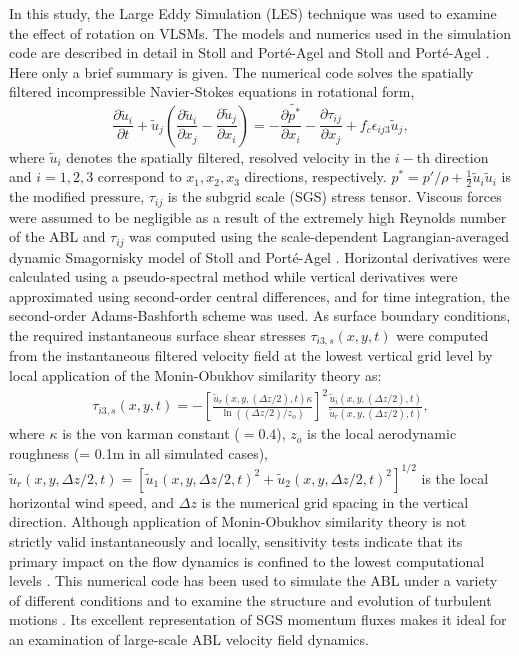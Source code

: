 In this study, the Large Eddy Simulation (LES) technique was used to examine the effect of rotation on VLSMs. The models and numerics used in the simulation code are described in detail in Stoll and Port{\'e}-Agel \cite{stoll_wrr_2006} and Stoll and Port{\'e}-Agel \cite{stoll_blm_2008}.  Here only a brief summary is given.  The numerical code solves the spatially filtered incompressible Navier-Stokes equations in rotational form,
\begin{equation}
    \frac{\partial \tilde{u}_i}{\partial t}+ \tilde{u}_j\left(\frac{\partial \tilde{u}_i}{\partial x_{j}} -\frac{\partial \tilde{u}_j}{\partial x_{i}} \right)  = -\frac{\partial \tilde{p^*}}{\partial x_i}-\frac{\partial \tau_{ij}}{\partial x_j}+f_{c}\epsilon_{ij3}\tilde{u}_{j},  
\label{eqn:les_eqn}
\end{equation}
\noindent where $\tilde{u}_i$ denotes the spatially filtered, resolved velocity in the $i-$th direction and $i=1, 2, 3$ correspond to $x_1, x_2, x_3$ directions, respectively. $p^{*}=p'/\rho + \frac{1}{2}\tilde{u}_i\tilde{u}_i$ is the modified pressure, $\tau_{ij}$ is the subgrid scale (SGS) stress tensor. Viscous forces were assumed to be negligible as a result of the extremely high Reynolds number of the ABL and $\tau_{ij}$ was computed using the scale-dependent Lagrangian-averaged dynamic Smagornisky model of  Stoll and Port{\'e}-Agel \cite{stoll_wrr_2006}. Horizontal derivatives were calculated using a pseudo-spectral method while vertical derivatives were approximated using second-order central differences, and for time integration, the second-order Adams-Bashforth scheme was used. As surface boundary conditions, the required instantaneous surface shear stresses $\tau_{i3,s}(x,y,t)$  were computed from the instantaneous filtered velocity field at the lowest vertical grid level by local application of the Monin-Obukhov similarity theory \cite{stoll_blm_2006} as:
\begin{align}
\tau_{i3,s}(x,y,t) = -\left [ \frac{\tilde{u}_r(x,y,(\Delta z/2),t)\kappa}{\ln((\Delta z/2)/z_o)} \right ]^2\frac{\tilde{u}_i(x,y,(\Delta z/2),t)}{\tilde{u}_r(x,y,(\Delta z/2),t)}, 
\end{align}
\noindent where $\kappa$ is the von karman constant ($=0.4$), $z_o$ is the local aerodynamic roughness (= 0.1m in all simulated cases), $\tilde{u}_r(x,y,\Delta z/2,t)=[\tilde{u}_1(x,y,\Delta z/2,t)^{2}+\tilde{u}_2(x,y,\Delta z/2,t)^{2}]^{1/2}$ is the local horizontal wind speed, and $\Delta z$ is the numerical grid spacing in the vertical direction. Although application of Monin-Obukhov similarity theory is not strictly valid instantaneously and locally, sensitivity tests indicate that its primary impact on the flow dynamics is confined to the lowest computational levels \cite{stoll_blm_2006}. This numerical code has been used to simulate the ABL under a variety of different conditions \cite[e.g.,]{stoll_jas_2009,bailey_blm_2013,miller_blm_2013} and to examine the structure and evolution of turbulent motions \cite[e.g.,]{bailey_ae_2014,bailey_jfm_2016}.  Its excellent representation of SGS momentum fluxes \cite{stoll_wrr_2006} makes it ideal for an examination of large-scale ABL velocity field dynamics.

